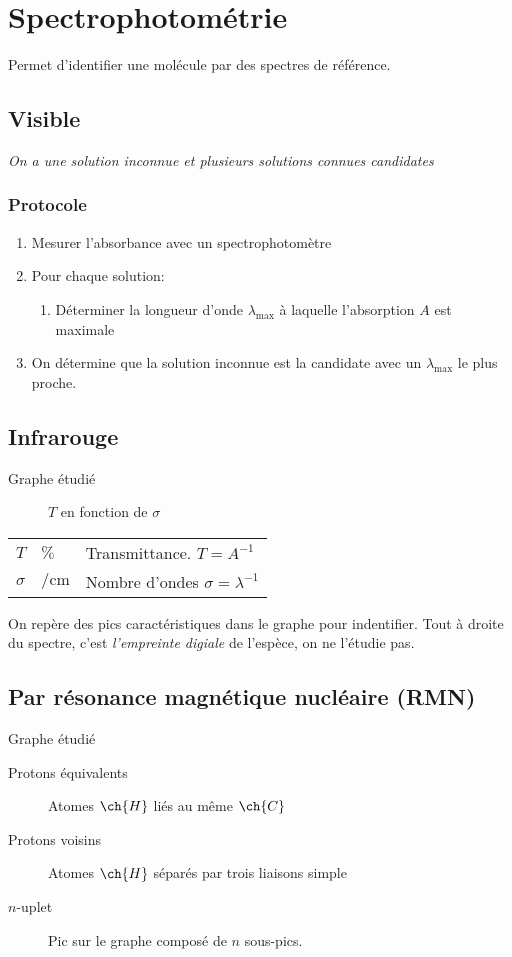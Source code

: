 \documentclass{article}
\let\ce\ch
\newcommand{\deftable}[2]{%
\begin{table}[h]
    \centering
    \begin{tabular}{llp{100mm}}%
        #1
    \end{tabular}
    \label{tab:#2_units}
\end{table}%
}
\newcommand{\deftablevar}[3]{%
    $#1$ & $\si{#2}$ & #3 \\
}
\begin{document}
\newpage
\section{Spectrophotométrie}
Permet d'identifier une molécule par des spectres de référence.

\subsection{Visible}

\emph{On a une solution inconnue et plusieurs solutions connues candidates}
\subsubsection{Protocole}
\begin{enumerate}
    \item Mesurer l'absorbance avec un spectrophotomètre
    \item Pour chaque solution:
    \begin{enumerate}
        \item Déterminer la longueur d'onde $\lambda_\text{max}$ à laquelle l'absorption $A$ est maximale
    \end{enumerate}
    \item On détermine que la solution inconnue est la candidate avec un $\lambda_\text{max}$ le plus proche.
\end{enumerate}

\subsection{Infrarouge}
\begin{description}
    \item[Graphe étudié] $T$ en fonction de $\sigma$
\end{description}
\deftable{
    \deftablevar{T}{\percent}{Transmittance. $T = A^{-1}$}
    \deftablevar{\sigma}{\per\centi\meter}{Nombre d'ondes $\sigma = \lambda^{-1}$}
}{Spectro IR}

On repère des pics caractéristiques dans le graphe pour indentifier.
Tout à droite du spectre, c'est \emph{l'empreinte digiale} de l'espèce, on ne l'étudie pas.

\subsection{Par résonance magnétique nucléaire (RMN)}
\begin{description}
    \item[Graphe étudié] 
\end{description}
\begin{description}
    \item[Protons équivalents] Atomes $\ce{H}$ liés au même $\ce{C}$
    \item[Protons voisins] Atomes $\ce{H}$ séparés par trois liaisons simple
    \item[$n$-uplet] Pic sur le graphe composé de $n$ sous-pics.
\end{description}
\end{document}

